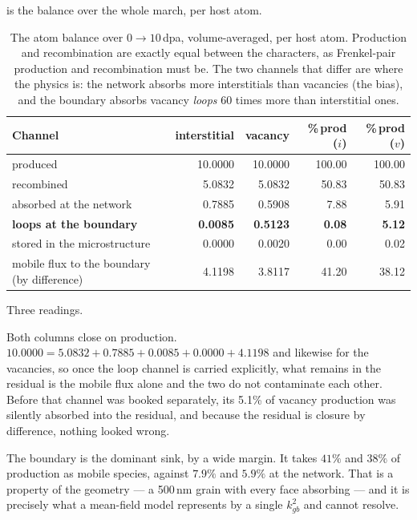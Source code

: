  is the balance over the whole march, per host atom.

\begin{table}[htbp]
\caption{The atom balance over $0\to10\,$dpa, volume-averaged, per host atom.
Production and recombination are exactly equal between the characters, as
Frenkel-pair production and recombination must be. The two channels that differ
are where the physics is: the network absorbs more interstitials than vacancies
(the bias), and the boundary absorbs vacancy \emph{loops} 60 times more than
interstitial ones.}
\label{tab:conservation}
\centering
\begin{tabular}{@{}lrrrr@{}}
\toprule
Channel & interstitial & vacancy & \%\,prod ($i$) & \%\,prod ($v$) \\
\midrule
produced                  & 10.0000 & 10.0000 & 100.00 & 100.00 \\
recombined                &  5.0832 &  5.0832 &  50.83 &  50.83 \\
absorbed at the network   &  0.7885 &  0.5908 &   7.88 &   5.91 \\
\textbf{loops at the boundary} & \textbf{0.0085} & \textbf{0.5123}
                          & \textbf{0.08} & \textbf{5.12} \\
stored in the microstructure & 0.0000 & 0.0020 & 0.00 & 0.02 \\
\midrule
mobile flux to the boundary (by difference)
                          &  4.1198 &  3.8117 &  41.20 &  38.12 \\
\bottomrule
\end{tabular}
\end{table}

Three readings.

Both columns close on production. $10.0000 = 5.0832+0.7885+0.0085+
0.0000+4.1198$ and likewise for the vacancies, so once the loop channel is
carried explicitly, what remains in the residual is the mobile flux alone and
the two do not contaminate each other. Before that channel was booked
separately, its 5.1\% of vacancy production was silently absorbed into the
residual, and because the residual is closure by difference, nothing looked
wrong.

The boundary is the dominant sink, by a wide margin. It takes
$41\%$ and $38\%$ of production as mobile species, against $7.9\%$ and $5.9\%$
at the network. That is a property of the geometry --- a 500\,nm grain with every
face absorbing --- and it is precisely what a mean-field model represents by a
single $k^{2}_{gb}$ and cannot resolve.

